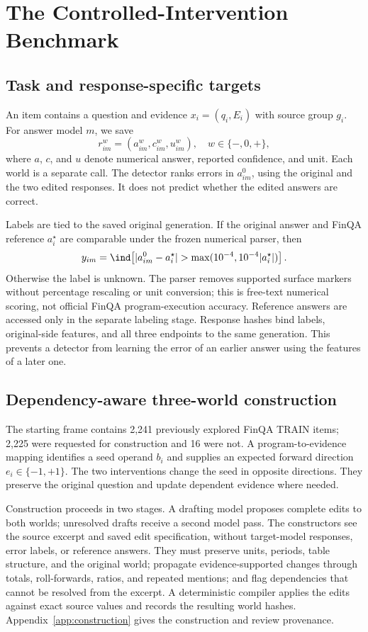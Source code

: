 \section{The Controlled-Intervention Benchmark}
\label{sec:benchmark}
\subsection{Task and response-specific targets}
An item contains a question and evidence $x_i=(q_i,E_i)$ with source group $g_i$. For answer model $m$, we save
\begin{equation}
 r_{im}^{w}=(a_{im}^{w},c_{im}^{w},u_{im}^{w}),\quad w\in\{-,0,+\},
\end{equation}
where $a$, $c$, and $u$ denote numerical answer, reported confidence, and unit. Each world is a separate call. The detector ranks errors in $a_{im}^{0}$, using the original and the two edited responses. It does not predict whether the edited answers are correct.

Labels are tied to the saved original generation. If the original answer and FinQA reference $a_i^\star$ are comparable under the frozen numerical parser, then
\begin{equation}
 y_{im}=\ind\!\left[|a_{im}^{0}-a_i^\star|>
 \max(10^{-4},10^{-4}|a_i^\star|)\right].
 \label{eq:target}
\end{equation}
Otherwise the label is unknown. The parser removes supported surface markers without percentage rescaling or unit conversion; this is free-text numerical scoring, not official FinQA program-execution accuracy. Reference answers are accessed only in the separate labeling stage. Response hashes bind labels, original-side features, and all three endpoints to the same generation. This prevents a detector from learning the error of an earlier answer using the features of a later one.

\subsection{Dependency-aware three-world construction}
The starting frame contains 2,241 previously explored FinQA TRAIN items; 2,225 were requested for construction and 16 were not. A program-to-evidence mapping identifies a seed operand $b_i$ and supplies an expected forward direction $e_i\in\{-1,+1\}$. The two interventions change the seed in opposite directions. They preserve the original question and update dependent evidence where needed.

Construction proceeds in two stages. A drafting model proposes complete edits to both worlds; unresolved drafts receive a second model pass. The constructors see the source excerpt and saved edit specification, without target-model responses, error labels, or reference answers. They must preserve units, periods, table structure, and the original world; propagate evidence-supported changes through totals, roll-forwards, ratios, and repeated mentions; and flag dependencies that cannot be resolved from the excerpt. A deterministic compiler applies the edits against exact source values and records the resulting world hashes. Appendix~\ref{app:construction} gives the construction and review provenance.

